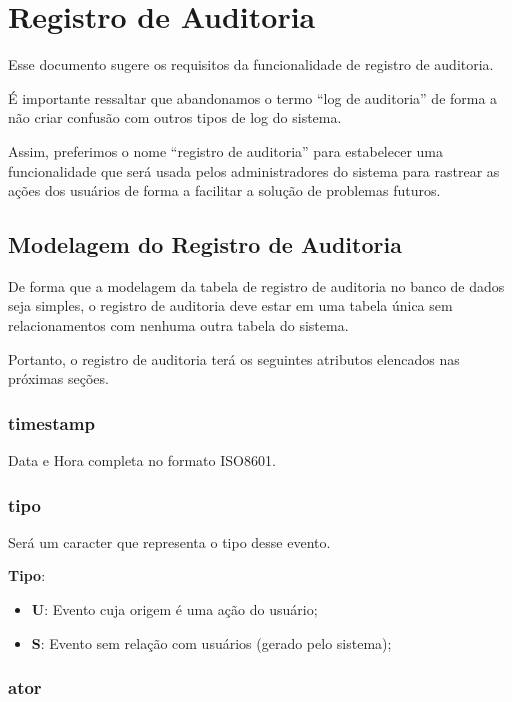 \chapter{Registro de Auditoria}
\label{detalhes:log-auditoria}

Esse documento sugere os requisitos da funcionalidade de registro de auditoria. 

É importante ressaltar que abandonamos o termo ``log de auditoria'' de forma a não criar confusão com outros tipos de log do sistema. 

Assim, preferimos o nome ``registro de auditoria'' para estabelecer uma funcionalidade que será usada pelos administradores do sistema para rastrear as ações dos usuários de forma a facilitar a solução de problemas futuros.

\section{Modelagem do Registro de Auditoria}

De forma que a modelagem da tabela de registro de auditoria no banco de dados seja simples, o registro de auditoria deve estar em uma tabela única sem relacionamentos com nenhuma outra tabela do sistema.

Portanto, o registro de auditoria terá os seguintes atributos elencados nas próximas seções.

\subsection{timestamp}

Data e Hora completa no formato ISO8601.

\subsection{tipo}

Será um caracter que representa o tipo desse evento.

\textbf{Tipo}: 
\begin{itemize}
	\item \textbf{U}: Evento cuja origem é uma ação do usuário;
	\item \textbf{S}: Evento sem relação com usuários (gerado pelo sistema);
\end{itemize}

\subsection{ator}


